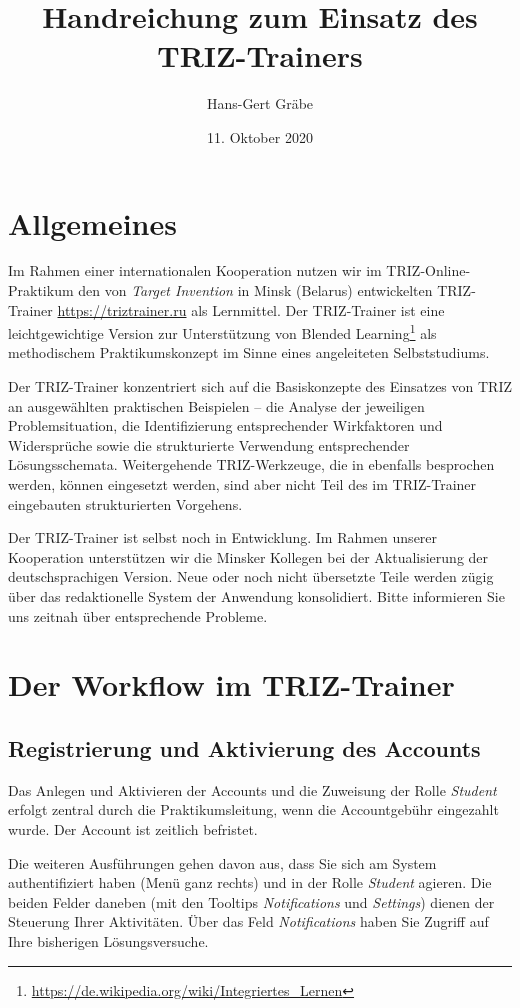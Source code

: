 \documentclass[11pt,a4paper]{article}
\title{Handreichung zum Einsatz des TRIZ-Trainers}
\author{Hans-Gert Gr\"abe}
\date{11. Oktober 2020}
\begin{document}
\maketitle
\tableofcontents

\section{Allgemeines}

Im Rahmen einer internationalen Kooperation nutzen wir im
TRIZ-Online-Praktikum den von \emph{Target Invention} in Minsk (Belarus)
entwickelten TRIZ-Trainer \url{https://triztrainer.ru} als Lernmittel.  Der
TRIZ-Trainer ist eine leichtgewichtige Version zur Unterstützung von Blended
Learning\footnote{\url{https://de.wikipedia.org/wiki/Integriertes_Lernen}} als
methodischem Praktikumskonzept im Sinne eines angeleiteten Selbststudiums. 

Der TRIZ-Trainer konzentriert sich auf die Basiskonzepte des Einsatzes von
TRIZ an ausgewählten praktischen Beispielen -- die Analyse der jeweiligen
Problemsituation, die Identifizierung entsprechender Wirkfaktoren und
Widersprüche sowie die strukturierte Verwendung entsprechender
Lösungsschemata.  Weitergehende TRIZ-Werkzeuge, die in \cite{KS2017} ebenfalls
besprochen werden, können eingesetzt werden, sind aber nicht Teil des im
TRIZ-Trainer eingebauten strukturierten Vorgehens.

Der TRIZ-Trainer ist selbst noch in Entwicklung.  Im Rahmen unserer
Kooperation unterstützen wir die Minsker Kollegen bei der Aktualisierung der
deutschsprachigen Version.  Neue oder noch nicht übersetzte Teile werden zügig
über das redaktionelle System der Anwendung konsolidiert.  Bitte informieren
Sie uns zeitnah über entsprechende Probleme.

\section{Der Workflow im TRIZ-Trainer}

\subsection{Registrierung und Aktivierung des Accounts}

Das Anlegen und Aktivieren der Accounts und die Zuweisung der Rolle
\emph{Student} erfolgt zentral durch die Praktikumsleitung, wenn die
Accountgebühr eingezahlt wurde.  Der Account ist zeitlich befristet.

Die weiteren Ausführungen gehen davon aus, dass Sie sich am System
authentifiziert haben (Menü ganz rechts) und in der Rolle \emph{Student}
agieren.  Die beiden Felder daneben (mit den Tooltips \emph{Notifications} und
\emph{Settings}) dienen der Steuerung Ihrer Aktivitäten. Über das Feld
\emph{Notifications} haben Sie Zugriff auf Ihre bisherigen Lösungsversuche.
\end{document}
